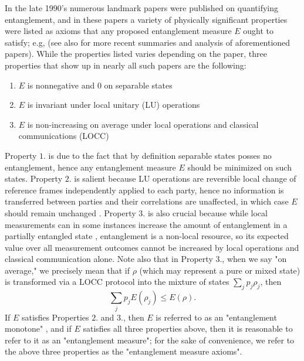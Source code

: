 \documentclass{article}
\begin{document}
In the late 1990's numerous landmark papers were published on quantifying entanglement, and in these papers a variety of physically significant properties were listed as axioms that any proposed entanglement measure $E$ ought to satisfy; e.g, \cite{bennett1996mixed,vedral1997quantifying,vidal2000entanglement,bennett2000exact} (see also \cite{eltschka2014quantifying,bengtsson2017geometry} for more recent summaries and analysis of aforementioned papers). While the properties listed varies depending on the paper, three properties that show up in nearly all such papers are the following:
\begin{enumerate}
    \item $E$ is nonnegative and $0$ on separable states
    \item $E$ is invariant under local unitary (LU) operations
    \item $E$ is non-increasing on average under local operations and classical communications (LOCC)
\end{enumerate}
Property $1.$ is due to the fact that by definition separable states posses no entanglement, hence any entanglement measure $E$ should be minimized on such states. Property $2.$ is salient because LU operations are reversible local change of reference frames independently applied to each party, hence no information is transferred between parties and their correlations are unaffected, in which case $E$ should remain unchanged \cite{monras2011entanglement}. Property $3.$ is also crucial because while local measurements can in some instances increase the amount of entanglement in a partially entangled state \cite{bennett1996concentrating}, entanglement is a non-local resource, so its expected value over all measurement outcomes cannot be increased by local operations and classical communication alone. Note also that in Property $3.$, when we say "on average," we precisely mean that if $\rho$ (which may represent a pure or mixed state) is transformed via a LOCC protocol into the mixture of states $\sum\limits_jp_j\rho_j$, then 
\[\sum\limits_jp_jE(\rho_j)\leq E(\rho).\]
If $E$ satisfies Properties $2.$ and $3.$, then $E$ is referred to as an "entanglement monotone" \cite{vidal2000entanglement}, and if $E$ satisfies all three properties above, then it is reasonable to refer to it as an "entanglement measure"; for the sake of convenience, we refer to the above three properties as the "entanglement measure axioms". 
\end{document}

